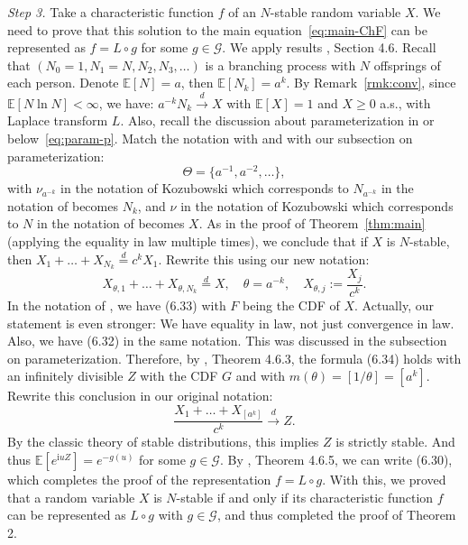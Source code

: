 \documentclass[12pt]{amsart}
\theoremstyle{remark}
\theoremstyle{definition}
\begin{document}
{\it Step 3.} Take a characteristic function $f$ of an $N$-stable random variable $X$. We need to prove that this solution to the main equation~\eqref{eq:main-ChF} can be represented as $f = L\circ g$ for some $g \in \mathcal G$. We apply results \cite[Chapter 4]{GnedenkoBook}, Section 4.6. Recall that 
$(N_0 = 1, N_1 = N, N_2, N_3,\ldots)$ is a branching process with $N$ offsprings of each person. Denote $\mathbb E[N] = a$, then $\mathbb E[N_k] = a^k$. By Remark~\ref{rmk:conv}, since $\mathbb E[N\ln N] < \infty$, we have: $a^{-k}N_k \stackrel{d}{\to} X$ with $\mathbb E[X] = 1$ and $X \ge 0$ a.s., with Laplace transform $L$. Also, recall the discussion about parameterization in or below~\eqref{eq:param-p}. Match the notation with \cite[Chapter 4]{GnedenkoBook} and with our subsection on parameterization: 
$$
\Theta = \{a^{-1}, a^{-2}, \ldots\},
$$
with $\nu_{a^{-k}}$ in the notation of Kozubowski which corresponds to $N_{a^{-k}}$ in the notation of \cite[Chapter 4]{GnedenkoBook} becomes $N_k$, and $\nu$ in the notation of Kozubowski which corresponds to $N$ in the notation of \cite[Chapter 4]{GnedenkoBook} becomes $X$. As in the proof of Theorem~\ref{thm:main} (applying the equality in law multiple times), we conclude that if $X$ is $N$-stable, then $X_1 + \ldots + X_{N_k} \stackrel{d}{=} c^kX_1$. Rewrite this using our new notation:
$$
X_{\theta, 1} + \ldots + X_{\theta, N_k} \stackrel{d}{=} X,\quad \theta = a^{-k},\quad X_{\theta, j} := \frac{X_j}{c^k}.
$$
In the notation of \cite[Chapter 4]{GnedenkoBook}, we have (6.33) with $F$ being the CDF of $X$. Actually, our statement is even stronger: We have equality in law, not just convergence in law. Also, we have (6.32) in the same notation. This was discussed in the subsection on parameterization. Therefore, by \cite[Chapter 4]{GnedenkoBook}, Theorem 4.6.3, the formula (6.34) holds with an infinitely divisible $Z$ with the CDF $G$ and with $m(\theta) = [1/\theta] = [a^k]$. Rewrite this conclusion in our original notation:
$$
\frac{X_1 + \ldots + X_{[a^k]}}{c^k} \stackrel{d}{\to} Z.
$$
By the classic theory of stable distributions, this implies $Z$ is strictly stable. And thus $\mathbb E\left[e^{\mathrm{i}uZ}\right] = e^{-g(u)}$ for some $g \in \mathcal G$. By \cite[Chapter 4]{GnedenkoBook}, Theorem 4.6.5, we can write (6.30), which completes the proof of the representation $f = L\circ g$. With this, we proved that a random variable $X$ is $N$-stable if and only if its characteristic function $f$ can be represented as $L\circ g$ with $g \in \mathcal G$, and thus completed the proof of Theorem 2. 
\end{document}
